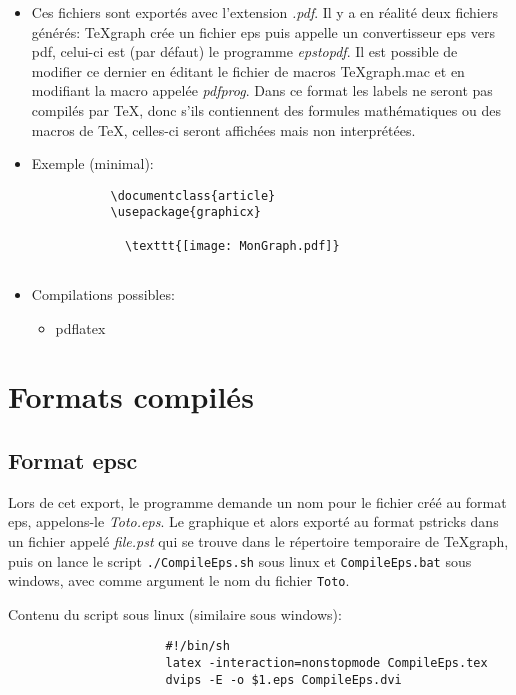 \begin{itemize}

\item Ces fichiers sont exportés avec l'extension \textit{.pdf}. Il y a en réalité deux fichiers générés: TeXgraph crée un fichier eps puis appelle un convertisseur eps vers pdf, celui-ci est (par défaut) le programme \textit{epstopdf}. Il  est possible de modifier ce dernier en éditant le fichier de macros TeXgraph.mac et en modifiant la macro appelée \textsl{pdfprog}. Dans ce format les labels ne seront pas compilés par TeX, donc s'ils contiennent des formules mathématiques ou des macros de TeX, celles-ci seront affichées mais non interprétées.

\item Exemple (minimal):

\begin{verbatim}
           \documentclass{article}
           \usepackage{graphicx}
            
             \texttt{[image: MonGraph.pdf]}
           
\end{verbatim}
\item Compilations possibles:
\begin{itemize}
\item pdflatex
\end{itemize}
\end{itemize}

\section{Formats compilés}

\subsection{Format epsc}

Lors de cet export, le programme demande un nom pour le fichier créé au format eps, appelons-le \textit{Toto.eps}. Le graphique et alors exporté au format pstricks dans un fichier appelé \textit{file.pst} qui se trouve dans le répertoire temporaire de TeXgraph, puis on lance  le script \verb|./CompileEps.sh| sous linux et \verb|CompileEps.bat| sous windows, avec comme argument le nom du fichier \verb|Toto|.

Contenu du script sous linux (similaire sous windows):

\begin{verbatim}
                      #!/bin/sh
                      latex -interaction=nonstopmode CompileEps.tex
                      dvips -E -o $1.eps CompileEps.dvi 
\end{verbatim}

